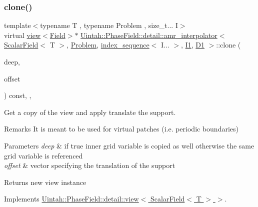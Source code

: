\subsubsection{\texorpdfstring{clone()}{clone()}\hspace{0.1cm}{\footnotesize\ttfamily [2/2]}}
{\footnotesize\ttfamily template$<$typename T , typename Problem , size\+\_\+t... I$>$ \\
virtual \hyperlink{classUintah_1_1PhaseField_1_1detail_1_1view}{view}$<$\hyperlink{structUintah_1_1PhaseField_1_1ScalarField}{Field}$>$$\ast$ \hyperlink{classUintah_1_1PhaseField_1_1detail_1_1amr__interpolator}{Uintah\+::\+Phase\+Field\+::detail\+::amr\+\_\+interpolator}$<$ \hyperlink{structUintah_1_1PhaseField_1_1ScalarField}{Scalar\+Field}$<$ T $>$, \hyperlink{classUintah_1_1PhaseField_1_1Problem}{Problem}, \hyperlink{namespaceUintah_1_1PhaseField_a237de804d99512e50613aff7c94a9461}{index\+\_\+sequence}$<$ I... $>$, \hyperlink{namespaceUintah_1_1PhaseField_a547ce3002aa97fbd3ef3192a6eec8406a66f19efe774b0d2b6e5844eb2d83d305}{I1}, \hyperlink{namespaceUintah_1_1PhaseField_a12bfc68444894dffdf0cb8d9cf0cc76aa24dcc0ba6bcb45bc6f503b1b538c6809}{D1} $>$\+::clone (\begin{DoxyParamCaption}\item[{bool}]{deep,  }\item[{const Int\+Vector \&}]{offset }\end{DoxyParamCaption}) const\hspace{0.3cm}{\ttfamily [inline]}, {\ttfamily [override]}, {\ttfamily [virtual]}}



Get a copy of the view and apply translate the support. 

\begin{DoxyRemark}{Remarks}
It is meant to be used for virtual patches (i.\+e. periodic boundaries)
\end{DoxyRemark}

\begin{DoxyParams}{Parameters}
{\em deep} & if true inner grid variable is copied as well otherwise the same grid variable is referenced \\
\hline
{\em offset} & vector specifying the translation of the support \\
\hline
\end{DoxyParams}
\begin{DoxyReturn}{Returns}
new view instance 
\end{DoxyReturn}


Implements \hyperlink{classUintah_1_1PhaseField_1_1detail_1_1view_3_01ScalarField_3_01T_01_4_01_4_abd928104240e329f3bc4441ebab7c50c}{Uintah\+::\+Phase\+Field\+::detail\+::view$<$ Scalar\+Field$<$ T $>$ $>$}.

